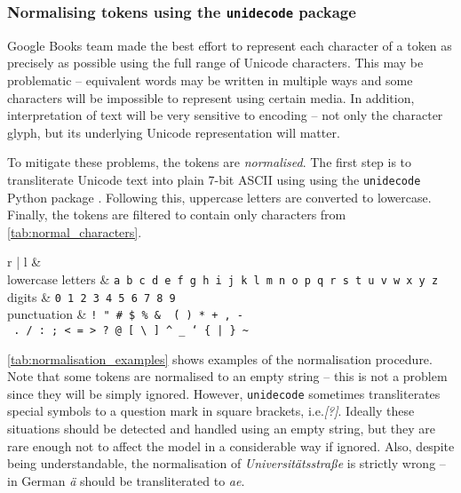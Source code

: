 \documentclass[draft]{IIBproject}
\makeatletter
\DeclareRobustCommand*{\ie}{i.e.\@\xspace}
\makeatother
\begin{document}
\subsubsection{Normalising tokens using the \texttt{unidecode} package}
\label{sec:normalising_tokens}

Google Books team made the best effort to represent each character of a token as precisely as possible using the full range of Unicode characters. This may be problematic -- equivalent words may be written in multiple ways and some characters will be impossible to represent using certain media. In addition, interpretation of text will be very sensitive to encoding -- not only the character glyph, but its underlying Unicode representation will matter.

To mitigate these problems, the tokens are \emph{normalised}. The first step is to transliterate Unicode text into plain 7-bit ASCII using using the \texttt{unidecode} Python package \cite{lib:unidecode}. Following this, uppercase letters are converted to lowercase. Finally, the tokens are filtered to contain only characters from \cref{tab:normal_characters}.

\begin{table}[h]
	\centering
	\begin{tabular}{r | l}
	 &  \\
	\hline
	lowercase letters & \texttt{\footnotesize a b c d e f g h i j k l m n o p q r s t u v w x y z} \\
	digits & \texttt{\footnotesize 0 1 2 3 4 5 6 7 8 9} \\
	punctuation & \texttt{\footnotesize !\ "\ \#\ \$\ \%\ \&\ \'\ (\ )\ *\ +\ ,\ -\ .\ /\ :\ ;\ <\ =\ >\ ?\ @\ [\ \textbackslash\ ]\ \textasciicircum\ \_\ `\ \{\ |\ \}\ \textasciitilde}
	\end{tabular}
	\caption{\label{tab:normal_characters}Characters that can be a part of a normalised token.}
\end{table}

\cref{tab:normalisation_examples} shows examples of the normalisation procedure. Note that some tokens are normalised to an empty string -- this is not a problem since they will be simply ignored. However, \texttt{unidecode} sometimes transliterates special symbols to a question mark in square brackets, \ie \emph{[?]}. Ideally these situations should be detected and handled using an empty string, but they are rare enough not to affect the model in a considerable way if ignored. Also, despite being understandable, the normalisation of \emph{Universitätsstraße} is strictly wrong -- in German \emph{ä} should be transliterated to \emph{ae}\cite{standard:din5007v2}.
\end{document}
